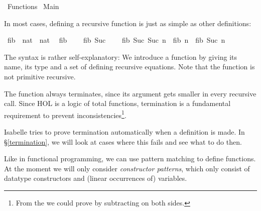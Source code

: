 %
\begin{isabellebody}%
\def\isabellecontext{Functions}%
%
\isadelimtheory
\isanewline
\isanewline
%
\endisadelimtheory
%
\isatagtheory
{}\isamarkupfalse%
\ Functions\isanewline
{}\ Main\isanewline
{}%
\endisatagtheory
{\isafoldtheory}%
%
\isadelimtheory
%
\endisadelimtheory
%
\isamarkuptrue%
%
\begin{isamarkuptext}%
In most cases, defining a recursive function is just as simple as other definitions:%
\end{isamarkuptext}%
\isamarkuptrue%
\isamarkupfalse%
\ fib\ {\isacharcolon}{\isacharcolon}\ {\isachardoublequoteopen}nat\ {\isasymRightarrow}\ nat{\isachardoublequoteclose}\isanewline
{}\isanewline
\ \ {\isachardoublequoteopen}fib\ {}\ {\isacharequal}\ {}{\isachardoublequoteclose}\isanewline
{\isacharbar}\ {\isachardoublequoteopen}fib\ {\isacharparenleft}Suc\ {}{\isacharparenright}\ {\isacharequal}\ {}{\isachardoublequoteclose}\isanewline
{\isacharbar}\ {\isachardoublequoteopen}fib\ {\isacharparenleft}Suc\ {\isacharparenleft}Suc\ n{\isacharparenright}{\isacharparenright}\ {\isacharequal}\ fib\ n\ {\isacharplus}\ fib\ {\isacharparenleft}Suc\ n{\isacharparenright}{\isachardoublequoteclose}%
\begin{isamarkuptext}%
The syntax is rather self-explanatory: We introduce a function by
  giving its name, its type and a set of defining recursive
  equations. Note that the function is not primitive recursive.%
\end{isamarkuptext}%
\isamarkuptrue%
%
\begin{isamarkuptext}%
The function always terminates, since its argument gets smaller in
  every recursive call. 
  Since HOL is a logic of total functions, termination is a
  fundamental requirement to prevent inconsistencies\footnote{From the
    we could prove 
   by subtracting  on both sides.}.

  Isabelle tries to prove termination automatically when a definition
  is made. In \S\ref{termination}, we will look at cases where this
  fails and see what to do then.%
\end{isamarkuptext}%
\isamarkuptrue%
%
\isamarkuptrue%
%
\begin{isamarkuptext}%
\label{patmatch}
  Like in functional programming, we can use pattern matching to
  define functions. At the moment we will only consider \emph{constructor
  patterns}, which only consist of datatype constructors and
  (linear occurrences of) variables.


\end{isamarkuptext}
\end{isabellebody}
